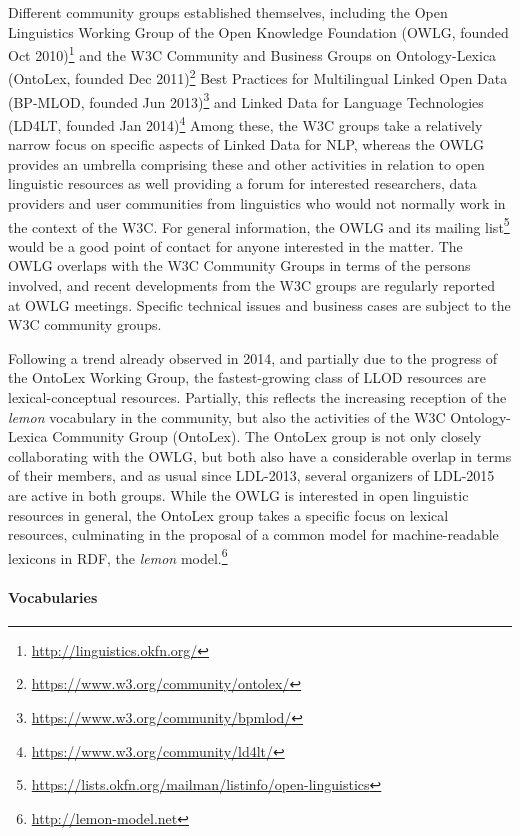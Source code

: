 Different community groups established themselves, including the 
Open Linguistics Working Group of the Open Knowledge Foundation (OWLG, founded Oct 2010)\footnote{
	\url{http://linguistics.okfn.org/}
}
and the W3C Community and Business Groups on Ontology-Lexica (OntoLex, founded Dec 2011)\footnote{
	\url{https://www.w3.org/community/ontolex/}
}
Best Practices for Multilingual Linked Open Data (BP-MLOD, founded Jun 2013)\footnote{
	\url{https://www.w3.org/community/bpmlod/}
} and Linked Data for Language Technologies (LD4LT, founded Jan 2014)\footnote{
	\url{https://www.w3.org/community/ld4lt/}
}
Among these, the W3C groups take a relatively narrow focus on specific aspects of Linked Data for NLP, whereas the OWLG provides an umbrella comprising these and other activities in relation to open linguistic resources as well providing a forum for interested researchers, data providers and user communities from linguistics who would not normally work in the context of the W3C. 
For general information, the OWLG and its mailing list\footnote{
	\url{https://lists.okfn.org/mailman/listinfo/open-linguistics}
} would be a good point of contact for anyone interested in the matter. 
The OWLG overlaps with the W3C Community Groups in terms of the persons involved, and recent developments from the W3C groups are regularly reported at OWLG meetings.
Specific technical issues and business cases are subject to the W3C community groups.

Following a trend already observed in 2014, and partially due to the progress of the OntoLex Working Group, the fastest-growing class of LLOD resources are lexical-conceptual resources. 
Partially, this reflects the increasing reception of the \emph{lemon} vocabulary in the community, but also the activities of the W3C Ontology-Lexica Community Group (OntoLex). The OntoLex group is not only closely collaborating with the OWLG, but both also have a considerable overlap in terms of their members, and as usual since LDL-2013, several organizers of LDL-2015 are active in both groups.
While the OWLG is interested in open linguistic resources in general, the OntoLex group takes a specific focus on lexical resources, culminating in the proposal of a common model for machine-readable lexicons in RDF, the \emph{lemon} model.\footnote{
	\url{http://lemon-model.net}
}

\paragraph{Vocabularies}

